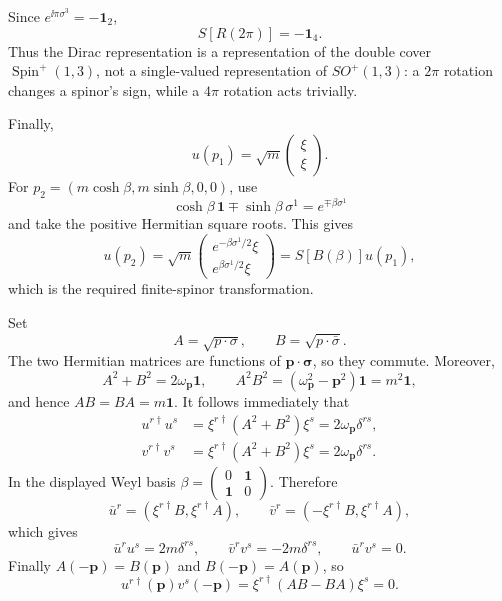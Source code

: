 \begin{enumerate}
Since \(e^{\ii\pi\sigma^3}=-\mathbf1_2\),
\[
 S[R(2\pi)]=-\mathbf1_4.
\]
Thus the Dirac representation is a representation of the double cover
\(\operatorname{Spin}^+(1,3)\), not a single-valued representation of
\(SO^+(1,3)\): a \(2\pi\) rotation changes a spinor's sign, while a
\(4\pi\) rotation acts trivially.

Finally,
\[
 u(p_1)=\sqrt m\begin{pmatrix}\xi\\\xi\end{pmatrix}.
\]
For \(p_2=(m\cosh\beta,m\sinh\beta,0,0)\), use
\[
 \cosh\beta\,\mathbf1\mathbin{\mp}
 \sinh\beta\,\sigma^1=e^{\mp\beta\sigma^1}
\]
and take the positive Hermitian square roots.  This gives
\[
 u(p_2)=\sqrt m
 \begin{pmatrix}
 e^{-\beta\sigma^1/2}\xi\\
 e^{\beta\sigma^1/2}\xi
 \end{pmatrix}
 =S[B(\beta)]u(p_1),
\]
which is the required finite-spinor transformation.

Set
\[
 A=\sqrt{p\cdot\sigma},\qquad B=\sqrt{p\cdot\bar\sigma}.
\]
The two Hermitian matrices are functions of
\(\mathbf p\cdot\boldsymbol\sigma\), so they commute.  Moreover,
\[
 A^2+B^2=2\omega_{\mathbf p}\mathbf1,\qquad
 A^2B^2=(\omega_{\mathbf p}^2-\mathbf p^2)\mathbf1=m^2\mathbf1,
\]
and hence \(AB=BA=m\mathbf1\).  It follows immediately that
\[
\begin{split}
u^{r\dagger}u^s
&=\xi^{r\dagger}(A^2+B^2)\xi^s
=2\omega_{\mathbf p}\delta^{rs},\\
v^{r\dagger}v^s
&=\xi^{r\dagger}(A^2+B^2)\xi^s
=2\omega_{\mathbf p}\delta^{rs}.
\end{split}
\]
In the displayed Weyl basis
\(\beta=\left(\begin{smallmatrix}0&\mathbf1\\
\mathbf1&0\end{smallmatrix}\right)\).  Therefore
\[
 \bar u^r=(\xi^{r\dagger}B,\xi^{r\dagger}A),\qquad
 \bar v^r=(-\xi^{r\dagger}B,\xi^{r\dagger}A),
\]
which gives
\[
 \bar u^ru^s=2m\delta^{rs},\qquad
 \bar v^rv^s=-2m\delta^{rs},\qquad
 \bar u^rv^s=0.
\]
Finally \(A(-\mathbf p)=B(\mathbf p)\) and
\(B(-\mathbf p)=A(\mathbf p)\), so
\[
 u^{r\dagger}(\mathbf p)v^s(-\mathbf p)
 =\xi^{r\dagger}(AB-BA)\xi^s=0.
\]


\end{enumerate}
